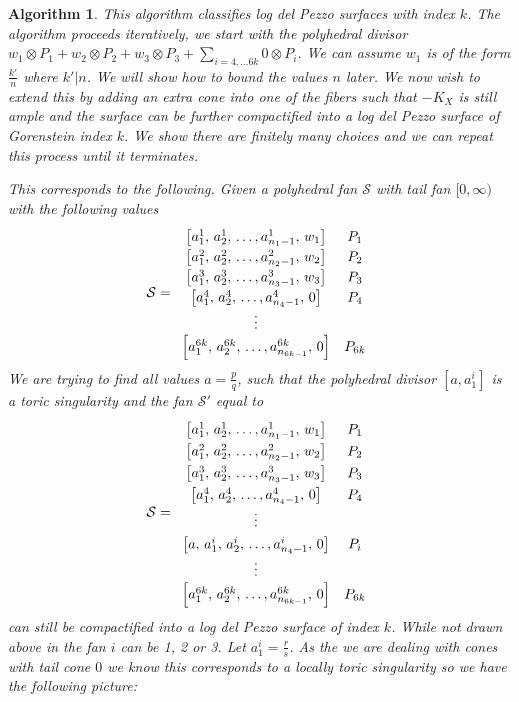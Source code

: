 \documentclass[12pt]{amsart}
\theoremstyle{plain}
\newtheorem{algorithm}[thm]{Algorithm}
\begin{document}
\begin{algorithm}
This algorithm classifies log del Pezzo surfaces with index $k$. The algorithm proceeds iteratively, we start with the polyhedral divisor $w_1 \otimes P_1 + w_2 \otimes P_2 + w_3 \otimes P_3 + \sum_{i = 4, \dots 6k} 0 \otimes P_i$. We can assume $w_1$ is of the form $\frac{k'}{n}$ where $k'|n$. We will show how to bound the values $n$ later. We now wish to extend this by adding an extra cone into one of the fibers such that $-K_X$ is still ample and the surface can be further compactified into a log del Pezzo surface of Gorenstein index $k$. We show there are finitely many choices and we can repeat this process until it terminates.

This corresponds to the following. Given a polyhedral fan $\mathcal{S}$ with tail fan $[0, \infty)$ with the following values
\[\def\arraystretch{1.2}
\mathcal{S} = 
\begin{array}{cc}
\left[ a_1^1,\,  a_2^1, \, \dots, a_{n_1 - 1}^1, \, w_1 \right] & P_1 \\
\left[a_1^2, \, a_2^2,\,  \dots, a_{n_2 - 1}^2, \, w_2 \right] & P_2 \\
\left[a_1^3, \, a_2^3,\,  \dots, a_{n_3 - 1}^3, \, w_3 \right] & P_3 \\
\left[a_1^4, \, a_2^4,\,  \dots, a_{n_4 - 1}^4, \, 0 \right] & P_4 \\
\vdots \\
\left[ a_1^{6k}, \, a_2^{6k}, \,  \dots, a_{n_{6k-1}}^{6k}, \, 0 \right] & P_{6k} \\
\end{array}
\]
We are trying to find all values $a = \frac{p}{q}$, such that the polyhedral divisor $[a, a_1^i]$ is a toric singularity and the fan $\mathcal{S}'$ equal to
\[\def\arraystretch{1.3}
\mathcal{S} = 
\begin{array}{cc}
\left[ a_1^1,\,  a_2^1, \, \dots, a_{n_1 - 1}^1, \, w_1 \right] & P_1 \\
\left[a_1^2, \, a_2^2,\,  \dots, a_{n_2 - 1}^2, \, w_2 \right] & P_2 \\
\left[a_1^3, \, a_2^3,\,  \dots, a_{n_3 - 1}^3, \, w_3 \right] & P_3 \\
\left[a_1^4, \, a_2^4,\,  \dots, a_{n_4 - 1}^4, \, 0 \right] & P_4 \\
\vdots \\
\left[a, \, a_1^i, \, a_2^i,\,  \dots, a_{n_4 - 1}^i, \, 0 \right] & P_i \\
\vdots \\
\left[ a_1^{6k}, \, a_2^{6k}, \,  \dots, a_{n_{6k-1}}^{6k}, \, 0 \right] & P_{6k} \\
\end{array}
\]
can still be compactified into a log del Pezzo surface of index $k$. While not drawn above in the fan $i$ can be 1, 2 or 3. Let $a_1^i = \frac{r}{s}$. As the we are dealing with cones with tail cone $0$ we know this corresponds to a locally toric singularity so we have the following picture:


\end{algorithm}
\end{document}
